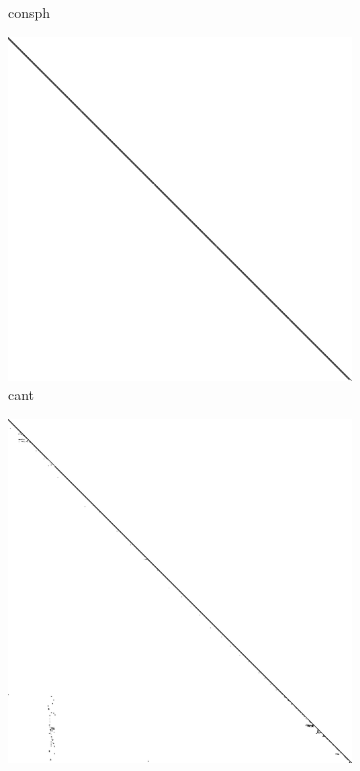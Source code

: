 \begin{figure}
\begin{multicols}{3}
\begin{subfigure}{\linewidth}
\caption{consph}
\end{subfigure}
\end{multicols}
\begin{multicols}{3}
\begin{subfigure}{\linewidth}
\includegraphics[width=\linewidth]{images/cant}
\caption{cant}
\end{subfigure}
\begin{subfigure}{\linewidth}
\includegraphics[width=\linewidth]{images/pwtk}

\end{subfigure}
\end{multicols}
\end{figure}
